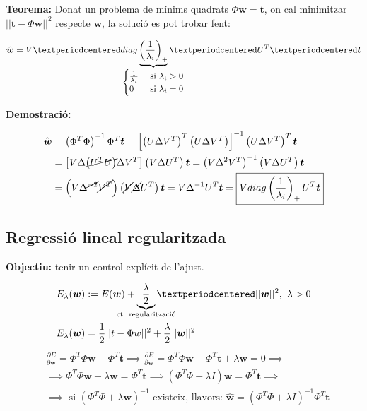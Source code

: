 \documentclass[a4paper]{article}
\begin{document}
\textbf{Teorema:} Donat un problema de mínims quadrats $ \Phi \boldsymbol{w} = \boldsymbol{t} $, on cal minimitzar $ ||\boldsymbol{t} - \Phi \boldsymbol{w} ||^2 $ respecte $\boldsymbol{w}$, la solució es pot trobar fent:

$$
\hat{\boldsymbol{w}} = V · diag \underbrace{\left( \frac{1}{\lambda_i}\right)_+}_{
	\mathclap{
		\begin{cases}
			\frac{1}{\lambda_i} &\text{ si } \lambda_i > 0 \\
			0 & \text{ si } \lambda_i = 0
		\end{cases}}} · U^T · \boldsymbol{t}
$$

\textbf{Demostració:}

\begin{align*}
\hat{\boldsymbol{w}} &= \left( \Phi^T \Phi \right)^{-1} \Phi^T \boldsymbol{t} =
\left[ \left( U \Delta V^T \right)^T \left( U\Delta V^T \right) \right]^{-1}
\left(U\Delta V^T\right)^T \boldsymbol{t} \\
& = \left[ V\Delta \cancel{\left( U^T U \right)} \Delta V^T \right] 
\left( V \Delta U^T \right) \boldsymbol{t} = 
\left( V \Delta^2 V^T \right)^{-1} \left( V \Delta U^T \right) \boldsymbol{t} \\ 
&=
\left( V \Delta^{\cancel{-2}} \cancel{V^T} \right) \left( \cancel{V} \cancel{\Delta} U^T \right) \boldsymbol{t} =
V \Delta^{-1} U^T \boldsymbol{t} = 
\boxed{V diag\left(\frac{1}{\lambda_i}\right)_+ U^T \boldsymbol{t}}
\end{align*}

\subsection{Regressió lineal regularitzada}

\textbf{Objectiu:} tenir un control explícit de l'ajust.

\begin{align*}
    & E_{\lambda} (\boldsymbol{w}) := E(\boldsymbol{w}) + \underbrace{\frac{\lambda}{2}}_{\mathclap{\text{ct. regularització}}}·||\boldsymbol{w}||^2, \ \lambda > 0 \\
    & E_{\lambda}(\boldsymbol{w}) = \frac{1}{2} || t - \Phi w ||^2 + \frac{\lambda}{2} || \boldsymbol{w} ||^2
\end{align*}
\begin{align*}
    & \frac{\partial E}{\partial \boldsymbol{w}} = 
    \Phi^T \Phi \boldsymbol{w} - \Phi^T \boldsymbol{t} \implies
    \frac{\partial E}{\partial \boldsymbol{w}} = 
    \Phi^T \Phi \boldsymbol{w} - \Phi^T \boldsymbol{t} + \lambda \boldsymbol{w} = 0 \implies \\
    & \implies \Phi^T \Phi \boldsymbol{w} + \lambda \boldsymbol{w} = \Phi^T \boldsymbol{t} \implies
    \left( \Phi^T \Phi + \lambda I \right) \boldsymbol{w} = \Phi^T \boldsymbol{t} \implies \\
    & \implies \text{ si } \left( \Phi^T \Phi + \lambda \boldsymbol{w} \right)^{-1} 
    \text{ existeix, llavors: } \hat{\boldsymbol{w}} = 
    \left( \Phi^T \Phi + \lambda I \right)^{-1} \Phi^T \boldsymbol{t}
\end{align*}
\end{document}
